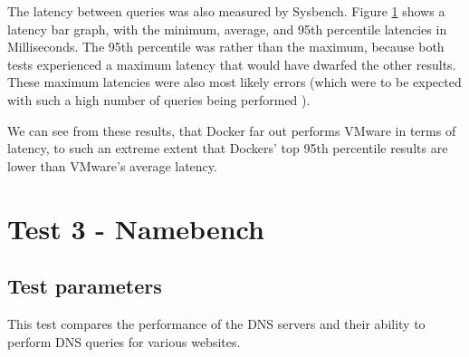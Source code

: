 The latency between queries was also measured by Sysbench. Figure \ref{test2latencygraph} shows a latency bar graph, with the minimum, average, and 95th percentile latencies in Milliseconds. The 95th percentile was rather than the maximum, because both tests experienced a maximum latency that would have dwarfed the other results. These maximum latencies were also most likely errors (which were to be expected with such a high number of queries being performed \citep{oltpbenchmarking}).

\begin{figure}[H]
\caption{}
\label{test2latencygraph}
\centering
\end{figure}

We can see from these results, that Docker far out performs VMware in terms of latency, to such an extreme extent that Dockers' top 95th percentile results are lower than VMware's average latency.

\section{Test 3 - Namebench}
\label{sec:Test3}
\subsection{Test parameters}
This test compares the performance of the DNS servers and their ability to perform DNS queries for various websites.

